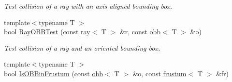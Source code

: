 \begin{DoxyCompactItemize}
\begin{DoxyCompactList}\small\item\em Test collision of a ray with an axis aligned bounding box. \item\end{DoxyCompactList}\item 
\hypertarget{group__geometric__primitives_gabd242edf62b381f793017cce0f2bec93}{
{\footnotesize template$<$typename T $>$ }\\bool \hyperlink{group__geometric__primitives_gabd242edf62b381f793017cce0f2bec93}{RayOBBTest} (const \hyperlink{classOpenRAVE_1_1geometry_1_1ray}{ray}$<$ T $>$ \&r, const \hyperlink{classOpenRAVE_1_1geometry_1_1obb}{obb}$<$ T $>$ \&o)}
\label{group__geometric__primitives_gabd242edf62b381f793017cce0f2bec93}

\begin{DoxyCompactList}\small\item\em Test collision of a ray and an oriented bounding box. \item\end{DoxyCompactList}\item 
\hypertarget{group__geometric__primitives_gadda8d6c416e9ccfdbaf22e6755929e7e}{
{\footnotesize template$<$typename T $>$ }\\bool \hyperlink{group__geometric__primitives_gadda8d6c416e9ccfdbaf22e6755929e7e}{IsOBBinFrustum} (const \hyperlink{classOpenRAVE_1_1geometry_1_1obb}{obb}$<$ T $>$ \&o, const \hyperlink{classOpenRAVE_1_1geometry_1_1frustum}{frustum}$<$ T $>$ \&fr)}
\label{group__geometric__primitives_gadda8d6c416e9ccfdbaf22e6755929e7e}


\end{DoxyCompactItemize}
